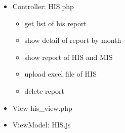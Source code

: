 \documentclass[letterpaper,10pt,english,openany,oneside]{sphinxmanual}
\begin{document}
\begin{sphinxVerbatim}[commandchars=\\\{\}]
               
\end{sphinxVerbatim}
\begin{itemize}
\item {} 
\sphinxAtStartPar
Controller: HIS.php
\begin{itemize}
\item {} 
\sphinxAtStartPar
{} get list of his report

\item {} 
\sphinxAtStartPar
{} show detail of report by month

\item {} 
\sphinxAtStartPar
{} show report of HIS and MIS

\item {} 
\sphinxAtStartPar
{} upload excel file of HIS

\item {} 
\sphinxAtStartPar
{} delete report

\end{itemize}

\item {} 
\sphinxAtStartPar
View his\_view.php

\item {} 
\sphinxAtStartPar
ViewModel: HIS.js

\end{itemize}
\end{document}
